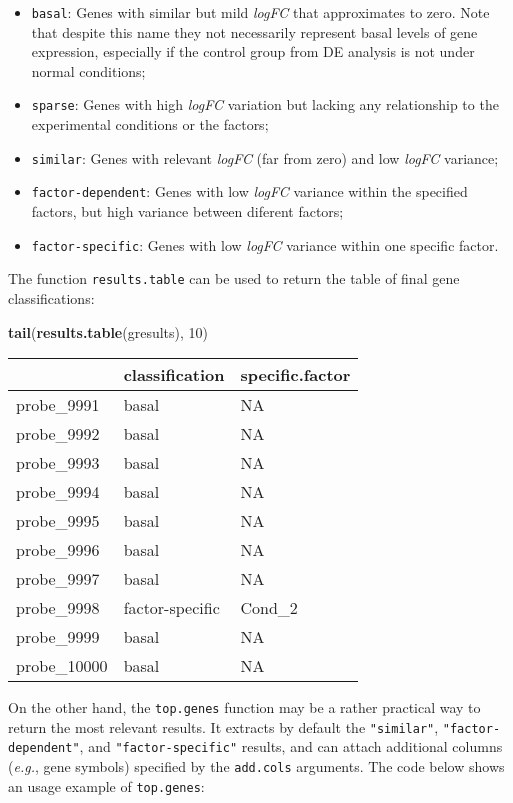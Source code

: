 \documentclass[
  12pt,
]{article}
\newenvironment{Shaded}{\begin{snugshade}}{\end{snugshade}}
\newcommand{\DecValTok}[1]{\textcolor[rgb]{0.00,0.00,0.81}{#1}}
\newcommand{\KeywordTok}[1]{\textcolor[rgb]{0.13,0.29,0.53}{\textbf{#1}}}
\newcommand{\NormalTok}[1]{#1}
\providecommand{\tightlist}{%
  \setlength{\itemsep}{0pt}\setlength{\parskip}{0pt}}
\begin{document}
\begin{itemize}
\tightlist
\item
  \texttt{basal}: Genes with similar but mild \emph{logFC} that
  approximates to zero. Note that despite this name they not necessarily
  represent basal levels of gene expression, especially if the control
  group from DE analysis is not under normal conditions;
\item
  \texttt{sparse}: Genes with high \emph{logFC} variation but lacking
  any relationship to the experimental conditions or the factors;
\item
  \texttt{similar}: Genes with relevant \emph{logFC} (far from zero) and
  low \emph{logFC} variance;
\item
  \texttt{factor-dependent}: Genes with low \emph{logFC} variance within
  the specified factors, but high variance between diferent factors;
\item
  \texttt{factor-specific}: Genes with low \emph{logFC} variance within
  one specific factor.
\end{itemize}

The function \texttt{results.table} can be used to return the table of
final gene classifications:

\begin{Shaded}
\begin{Highlighting}[]
\KeywordTok{tail}\NormalTok{(}\KeywordTok{results.table}\NormalTok{(gresults), }\DecValTok{10}\NormalTok{)}
\end{Highlighting}
\end{Shaded}

\begin{longtable}[]{@{}lll@{}}
\toprule
& classification & specific.factor\tabularnewline
\midrule
\endhead
probe\_9991 & basal & NA\tabularnewline
probe\_9992 & basal & NA\tabularnewline
probe\_9993 & basal & NA\tabularnewline
probe\_9994 & basal & NA\tabularnewline
probe\_9995 & basal & NA\tabularnewline
probe\_9996 & basal & NA\tabularnewline
probe\_9997 & basal & NA\tabularnewline
probe\_9998 & factor-specific & Cond\_2\tabularnewline
probe\_9999 & basal & NA\tabularnewline
probe\_10000 & basal & NA\tabularnewline
\bottomrule
\end{longtable}

On the other hand, the \texttt{top.genes} function may be a rather
practical way to return the most relevant results. It extracts by
default the \texttt{"similar"}, \texttt{"factor-dependent"}, and
\texttt{"factor-specific"} results, and can attach additional columns
(\emph{e.g.}, gene symbols) specified by the \texttt{add.cols}
arguments. The code below shows an usage example of \texttt{top.genes}:
\end{document}
